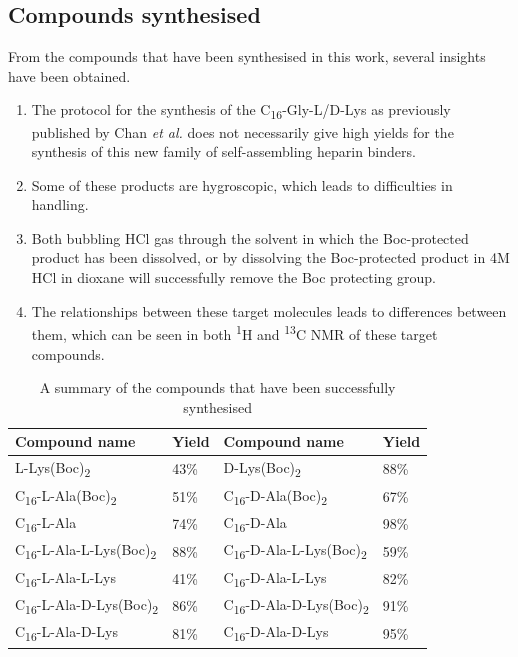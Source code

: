 \subsection{Compounds synthesised} 
From the compounds that have been synthesised in this work, several insights have been obtained. 
\begin{enumerate}
\item The protocol for the synthesis of the C\textsubscript{16}-Gly-L/D-Lys as previously published by Chan \textit{et al.} does not necessarily give high yields for the synthesis of this new family of self-assembling heparin binders.
\item Some of these products are hygroscopic, which leads to difficulties in handling.
\item Both bubbling HCl gas through the solvent in which the Boc-protected product has been dissolved, or by dissolving the Boc-protected product in 4M HCl in dioxane will successfully remove the Boc protecting group. 
\item The relationships between these target molecules leads to differences between them, which can be seen in both \textsuperscript{1}H and \textsuperscript{13}C NMR of these target compounds. 
\end{enumerate}

\begin{table}[h!]
\centering
\caption{A summary of the compounds that have been successfully synthesised}
\begin{tabular}{l|l||l|l}
\textbf{Compound name} & \textbf{Yield} & \textbf{Compound name} & \textbf{Yield}\\
\hline
L-Lys(Boc)\textsubscript{2}& 43\% & D-Lys(Boc)\textsubscript{2} & 88\% \\

C\textsubscript{16}-L-Ala(Boc)\textsubscript{2}& 51\% & C\textsubscript{16}-D-Ala(Boc)\textsubscript{2} & 67\% \\

C\textsubscript{16}-L-Ala & 74\% & C\textsubscript{16}-D-Ala &  98\% \\

C\textsubscript{16}-L-Ala-L-Lys(Boc)\textsubscript{2} & 88\% & C\textsubscript{16}-D-Ala-L-Lys(Boc)\textsubscript{2}&  59\% \\

C\textsubscript{16}-L-Ala-L-Lys & 41\% &
C\textsubscript{16}-D-Ala-L-Lys & 82\%\\

C\textsubscript{16}-L-Ala-D-Lys(Boc)\textsubscript{2} & 86\% &
C\textsubscript{16}-D-Ala-D-Lys(Boc)\textsubscript{2}& 91\% \\

C\textsubscript{16}-L-Ala-D-Lys& 81\% & 
C\textsubscript{16}-D-Ala-D-Lys & 95\% \\

\end{tabular}
\label{compounds_synthesised}
\end{table}
\newpage

